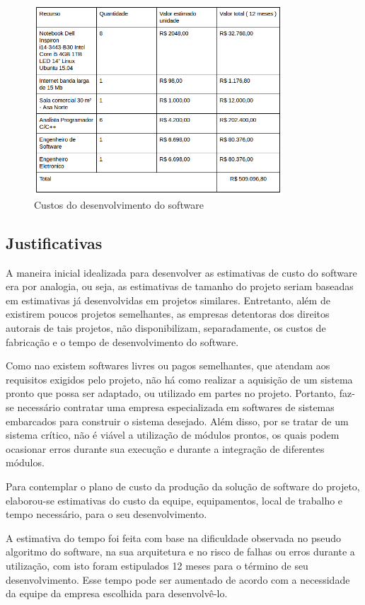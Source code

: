 \begin{figure}[h]
  \centering
  \includegraphics[width=350px, scale=1]{figuras/custo_soft}
  \caption{Custos do desenvolvimento do software}
\label{fig:custo_soft}
\end{figure}

\subsection{Justificativas}

A maneira inicial idealizada para desenvolver as estimativas de custo do software era por analogia,  ou seja, as estimativas de tamanho do projeto seriam baseadas em estimativas já desenvolvidas em projetos similares. Entretanto, além de existirem poucos projetos semelhantes, as empresas detentoras dos direitos autorais de tais projetos, não disponibilizam, separadamente, os custos de fabricação e o tempo de desenvolvimento do software.

Como nao existem softwares livres ou pagos semelhantes, que atendam aos requisitos exigidos pelo projeto, não há como realizar a aquisição de um sistema pronto que possa ser adaptado, ou utilizado em partes no projeto. Portanto, faz-se necessário contratar uma empresa especializada em softwares de sistemas embarcados para construir o sistema desejado. Além disso, por se tratar de um sistema crítico, não é viável a utilização de módulos prontos, os quais podem ocasionar erros durante sua execução e durante a integração de diferentes módulos.

Para contemplar o plano de custo da produção da solução de software do projeto, elaborou-se estimativas do custo da equipe, equipamentos, local de trabalho e tempo necessário, para o seu desenvolvimento.

A estimativa do tempo foi feita com base na dificuldade observada no  pseudo algoritmo do software, na sua arquitetura e no risco de falhas ou erros durante a utilização, com isto foram estipulados 12 meses para o término de seu desenvolvimento. Esse tempo pode ser aumentado de acordo com a necessidade da equipe da empresa escolhida para desenvolvê-lo.

